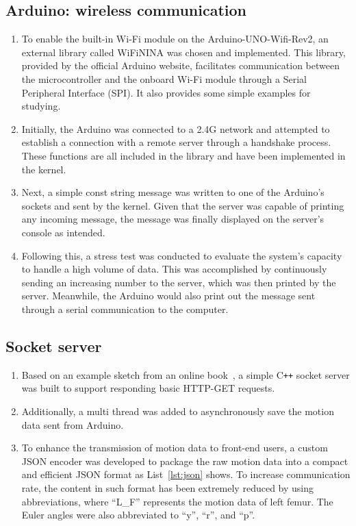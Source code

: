\subsection{Arduino: wireless communication} \label{subsec:5g-network}
\begin{enumerate}
	\item   To enable the built-in Wi-Fi module on the Arduino-UNO-Wifi-Rev2, an external library called WiFiNINA was chosen and implemented.
	This library, provided by the official Arduino website, facilitates communication between the microcontroller and the onboard Wi-Fi module through a Serial Peripheral Interface (SPI).
	It also provides some simple examples for studying.
	\item   Initially, the Arduino was connected to a 2.4G network and attempted to establish a connection with a remote server through a handshake process.
	These functions are all included in the library and have been implemented in the kernel.
	\item   Next, a simple const string message was written to one of the Arduino's sockets and sent by the kernel.
	Given that the server was capable of printing any incoming message, the message was finally displayed on the server's console as intended.
	\item   Following this, a stress test was conducted to evaluate the system's capacity to handle a high volume of data.
	This was accomplished by continuously sending an increasing number to the server, which was then printed by the server.
	Meanwhile, the Arduino would also print out the message sent through a serial communication to the computer.
\end{enumerate}

\subsection{Socket server}
\begin{enumerate}
	\item   Based on an example sketch from an online book~\cite{beej-guide}, a simple C\texttt{++} socket server was built to support responding basic HTTP-GET requests.
	\item   Additionally, a multi thread was added to asynchronously save the motion data sent from Arduino.
	\item   To enhance the transmission of motion data to front-end users, a custom JSON encoder was developed to package the raw motion data into a compact and efficient JSON format as List~\ref{lst:json} shows.
	To increase communication rate, the content in such format has been extremely reduced by using abbreviations, where ``L\_F'' represents the motion data of left femur.
	The Euler angles were also abbreviated to ``y'', ``r'', and ``p''.
\end{enumerate}

